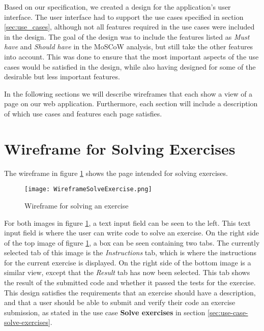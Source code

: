 Based on our specification, we created a design for the application's user interface. The user interface had to support the use cases specified in section \ref*{sec:use_cases}, although not all features required in the use cases were included in the design. The goal of the design was to include the features listed as \textit{Must have} and \textit{Should have} in the MoSCoW analysis, but still take the other features into account. This was done to ensure that the most important aspects of the use cases would be satisfied in the design, while also having designed for some of the desirable but less important features.

In the following sections we will describe wireframes that each show a view of a page on our web application. Furthermore, each section will include a description of which use cases and features each page satisfies.

\section{Wireframe for Solving Exercises}
The wireframe in figure \ref{fig:wfExercise} shows the page intended for solving exercises.
\begin{figure}[H]
	\texttt{[image: WireframeSolveExercise.png]}
	\centering
	\caption{Wireframe for solving an exercise}
	\label{fig:wfExercise}
\end{figure}

For both images in figure \ref{fig:wfExercise}, a text input field can be seen to the left. This text input field is where the user can write code to solve an exercise. On the right side of the top image of figure \ref{fig:wfExercise}, a box can be seen containing two tabs. The currently selected tab of this image is the \textit{Instructions} tab, which is where the instructions for the current exercise is displayed. On the right side of the bottom image is a similar view, except that the \textit{Result} tab has now been selected. This tab shows the result of the submitted code and whether it passed the tests for the exercise. This design satisfies the requirements that an exercise should have a description, and that a user should be able to submit and verify their code an exercise submission, as stated in the use case \textbf{Solve exercises} in section \ref{sec:use-case-solve-exercises}.

